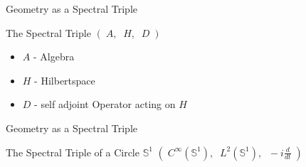 \documentclass[fleqn]{beamer}
\begin{document}
    \begin{frame}{Geometry as a Spectral Triple}
        \begin{block}
            {\centering The Spectral Triple}
            \centering
            $(\;A,\;\; H,\;\; D\;)$
        \end{block}
        \begin{itemize}
            \item $A$ - Algebra
            \item $H$ - Hilbertspace
            \item $D$ - self adjoint Operator acting on $H$
        \end{itemize}
    \end{frame}

    \begin{frame}{Geometry as a Spectral Triple}
        \begin{block}
            {The Spectral Triple of a Circle $\mathbb{S}^1$}
        \centering
                $ (\; C^{\infty}(\mathbb{S}^1),\;\; L^2(\mathbb{S}^1),\;\; -i\frac{d}{dt} \;)$
        \end{block}
    \end{frame}
\end{document}
